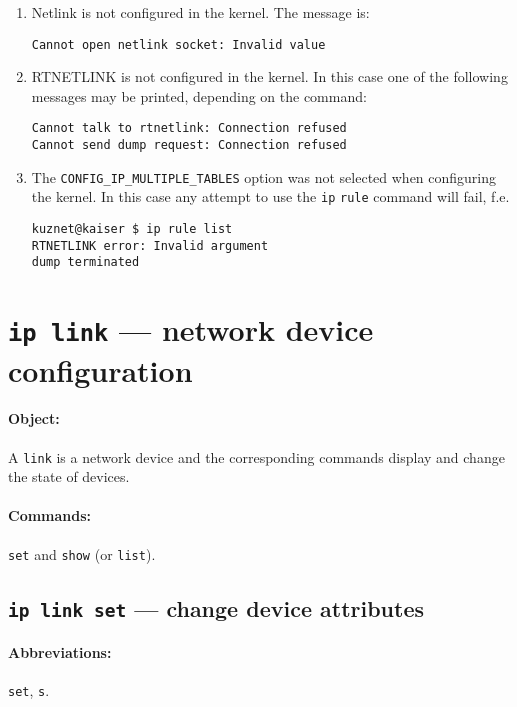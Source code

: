 \begin{enumerate}
\item Netlink is not configured in the kernel. The message is:
\begin{verbatim}
Cannot open netlink socket: Invalid value
\end{verbatim}

\item RTNETLINK is not configured in the kernel. In this case
one of the following messages may be printed, depending on the command:
\begin{verbatim}
Cannot talk to rtnetlink: Connection refused
Cannot send dump request: Connection refused
\end{verbatim}

\item The \verb|CONFIG_IP_MULTIPLE_TABLES| option was not selected
when configuring the kernel. In this case any attempt to use the
\verb|ip| \verb|rule| command will fail, f.e.
\begin{verbatim}
kuznet@kaiser $ ip rule list
RTNETLINK error: Invalid argument
dump terminated
\end{verbatim}

\end{enumerate}


\section{{\tt ip link} --- network device configuration}
\label{IP-LINK}

\paragraph{Object:} A \verb|link| is a network device and the corresponding
commands display and change the state of devices.

\paragraph{Commands:} \verb|set| and \verb|show| (or \verb|list|).

\subsection{{\tt ip link set} --- change device attributes}

\paragraph{Abbreviations:} \verb|set|, \verb|s|.

